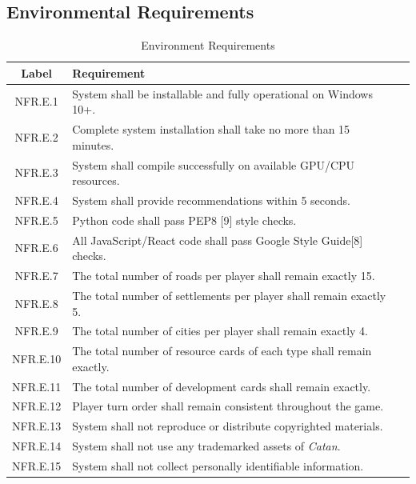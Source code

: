 \documentclass{article}
\begin{document}
\subsection*{Environmental Requirements}

\begin{table}[h!]
    \centering
    \caption{Environment Requirements }
    \label{tab:nfr}
    \begin{tabular}{|c|p{8.5cm}|>{\centering\arraybackslash}p{3.5cm}|}
    \hline
    \textbf{Label} & \textbf{Requirement} \\
    \hline
    NFR.E.1 & System shall be installable and fully operational on Windows 10+. \label{NFR.E.1} \\
    \hline
    NFR.E.2 & Complete system installation shall take no more than 15 minutes. \label{NFR.E.2} \\
    \hline
    NFR.E.3 & System shall compile successfully on available GPU/CPU resources. \label{NFR.E.3} \\
    \hline
    NFR.E.4 & System shall provide \AI{} recommendations within 5 seconds. \label{NFR.E.4} \\
    \hline
    NFR.E.5 & Python code shall pass PEP8 [9] style checks. \label{NFR.E.5} \\
    \hline
    NFR.E.6 & All JavaScript/React code shall pass Google Style Guide[8] checks. \label{NFR.E.6} \\
    \hline
    NFR.E.7 & The total number of roads per player shall remain exactly 15. \label{NFR.E.7} \\
    \hline
    NFR.E.8 & The total number of settlements per player shall remain exactly 5. \label{NFR.E.8} \\
    \hline
    NFR.E.9 & The total number of cities per player shall remain exactly 4. \label{NFR.E.9} \\
    \hline
    NFR.E.10 & The total number of resource cards of each type shall remain exactly. \label{NFR.E.10} \\
    \hline
    NFR.E.11 & The total number of development cards shall remain exactly. \label{NFR.E.11} \\
    \hline
    NFR.E.12 & Player turn order shall remain consistent throughout the game. \label{NFR.E.12} \\
    \hline
    NFR.E.13 & System shall not reproduce or distribute copyrighted materials. \label{NFR.E.13} \\
    \hline
    NFR.E.14 & System shall not use any trademarked assets of \emph{Catan{}}. \label{NFR.E.14} \\
    \hline
    NFR.E.15 & System shall not collect personally identifiable information. \label{NFR.E.15} \\
    \hline
    \end{tabular}
\end{table}
\end{document}
